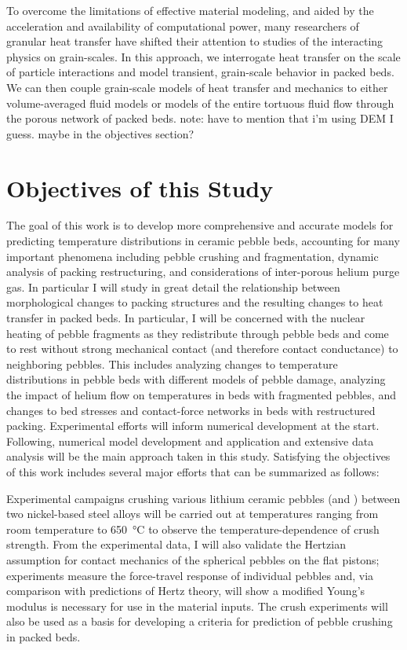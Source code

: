 To overcome the limitations of effective material modeling, and aided by the acceleration and availability of computational power, many researchers of granular heat transfer have shifted their attention to studies of the interacting physics on grain-scales. In this approach, we interrogate heat transfer on the scale of particle interactions and model transient, grain-scale behavior in packed beds. We can then couple grain-scale models of heat transfer and mechanics to either volume-averaged fluid models or models of the entire tortuous fluid flow through the porous network of packed beds.
note: have to mention that i'm using DEM I guess. maybe in the objectives section?

\section{Objectives of this Study}\label{sec:intro-scope-of-work}
The goal of this work is to develop more comprehensive and accurate models for predicting temperature distributions in ceramic pebble beds, accounting for many important phenomena including pebble crushing and fragmentation, dynamic analysis of packing restructuring, and considerations of inter-porous helium purge gas. In particular I will study in great detail the relationship between morphological changes to packing structures and the resulting changes to heat transfer in packed beds. In particular, I will be concerned with the nuclear heating of pebble fragments as they redistribute through pebble beds and come to rest without strong mechanical contact (and therefore contact conductance) to neighboring pebbles. This includes analyzing changes to temperature distributions in pebble beds with different models of pebble damage, analyzing the impact of helium flow on temperatures in beds with fragmented pebbles, and changes to bed stresses and contact-force networks in beds with restructured packing. Experimental efforts will inform numerical development at the start. Following, numerical model development and application and extensive data analysis will be the main approach taken in this study. Satisfying the objectives of this work includes several major efforts that can be summarized as follows:

Experimental campaigns crushing various lithium ceramic pebbles (\lit and \lis) between two nickel-based steel alloys will be carried out at temperatures ranging from room temperature to \SI{650}{\celsius} to observe the temperature-dependence of crush strength. From the experimental data, I will also validate the Hertzian assumption for contact mechanics of the spherical pebbles on the flat pistons; experiments measure the force-travel response of individual pebbles and, via comparison with predictions of Hertz theory, will show a modified Young's modulus is necessary for use in the material inputs. The crush experiments will also be used as a basis for developing a criteria for prediction of pebble crushing in packed beds. 


